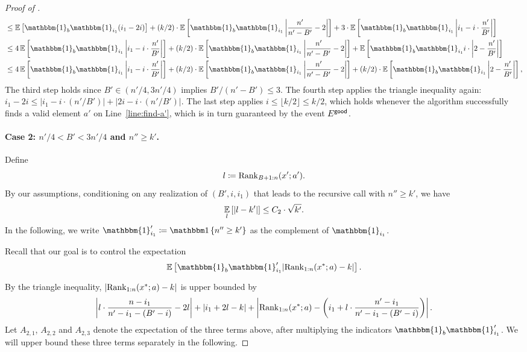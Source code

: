 \begin{proof}[Proof of ]
\begin{align*}
&\le        \Ex{}{\mathbbm{1}_{b}\mathbbm{1}_{i_1}(i_1 - 2i)} + (k/2)\cdot \Ex{}{\mathbbm{1}_{b}\mathbbm{1}_{i_1}\left|\frac{n'}{n'-B'}-2\right|} + 3\cdot \Ex{}{\mathbbm{1}_{b}\mathbbm{1}_{i_1}\left|i_1 - i\cdot \frac{n'}{B'}\right|
}\\
&\le        4\Ex{}{\mathbbm{1}_{b}\mathbbm{1}_{i_1}\left|i_1 - i\cdot \frac{n'}{B'}\right|} + (k/2)\cdot \Ex{}{\mathbbm{1}_{b}\mathbbm{1}_{i_1}\left|\frac{n'}{n'-B'}-2\right|} +  \Ex{}{\mathbbm{1}_{b}\mathbbm{1}_{i_1}i\cdot \left|2 - \frac{n'}{B'}\right|}\\
&\le        4\Ex{}{\mathbbm{1}_{b}\mathbbm{1}_{i_1}\left|i_1 - i\cdot \frac{n'}{B'}\right|} + (k/2)\cdot \Ex{}{\mathbbm{1}_{b}\mathbbm{1}_{i_1}\left|\frac{n'}{n'-B'}-2\right|}+ (k/2)\cdot \Ex{}{ \mathbbm{1}_{b}\mathbbm{1}_{i_1}\left|2 - \frac{n'}{B'}\right|},
\end{align*}
The third step holds since $B' \in (n'/4, 3n'/4)$ implies $B' / (n' - B') \le 3$. The fourth step applies the triangle inequality again: $i_1 - 2i \le |i_1 - i\cdot(n' / B')| + |2i - i\cdot(n' / B')|$. The last step applies $i \le \lfloor k / 2\rfloor \le k /2$, which holds whenever the algorithm successfully finds a valid element $a'$ on Line~\ref{line:find-a'}, which is in turn guaranteed by the event $E^{\textsf{good}}$.

\paragraph{Case 2: $n' / 4 < B' < 3n'/4$ and $n'' \ge k'$.} Define
    \[l \coloneqq\mathrm{Rank}_{B+1:n}(x'; a').\]
By our assumptions, conditioning on any realization of $(B', i, i_1)$ that leads to the recursive call with $n'' \ge k'$, we have
\begin{equation}\label{eq:lemma-assumption}
    \operatorname*{\mathbb{E}}_{l}\left[\left|l - k'\right|\right] \le C_2 \cdot \sqrt{k'}. 
\end{equation}
In the following, we write $\mathbbm{1}_{i_1}' \coloneqq \1{n'' \ge k'}$ as the complement of $\mathbbm{1}_{i_1}$.

Recall that our goal is to control the expectation
\[
    \Ex{}{\mathbbm{1}_b\mathbbm{1}'_{i_1}|\rank_{1:n}(x^*; a) - k|}.
\]
By the triangle inequality, $|\mathrm{Rank}_{1:n}(x^*; a) - k|$ is upper bounded by
\begin{equation}\label{eq:case-2-three-terms}
    \left|l\cdot \frac{n-i_1}{n'-i_1 - (B'-i)} - 2l\right|
+   |i_1 + 2l - k|
+   \left|\mathrm{Rank}_{1:n}(x^*; a) - \left(i_1+l\cdot \frac{n'-i_1}{n'-i_1-(B'-i)}\right)\right|.
\end{equation}
Let $A_{2,1}$, $A_{2,2}$ and $A_{2,3}$ denote the expectation of the three terms above, after multiplying the indicators $\mathbbm{1}_b\mathbbm{1}'_{i_1}$. We will upper bound these three terms separately in the following.


\end{proof}
